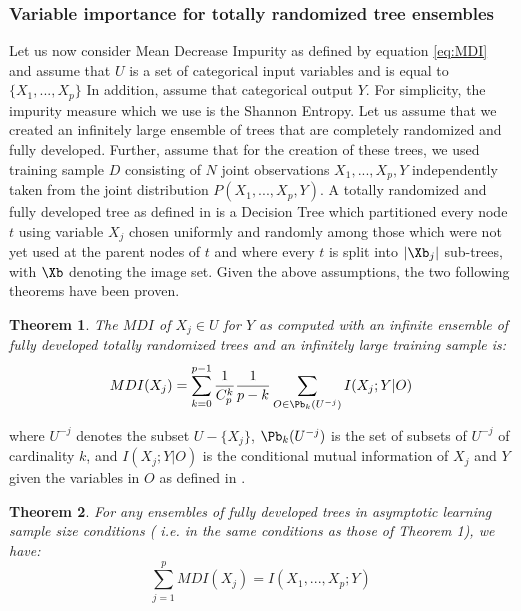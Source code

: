 \subsubsection{Variable importance for totally randomized tree ensembles}
Let us now consider Mean Decrease Impurity as defined by equation \eqref{eq:MDI} 
and assume that $U$ is a set of categorical input variables 
and is equal to $\{X_1,...,X_p\}$ 
In addition, assume that categorical output $Y$. 
For simplicity, the impurity measure which we use is the Shannon Entropy. 
Let us assume that we created an infinitely large ensemble of trees that are completely randomized and fully developed.
Further, assume  that for the creation of these trees, we used training sample $D$ consisting of $N$ joint observations 
$X_1,...,X_p,Y$ independently taken from the joint distribution $P(X_1,...,X_p,Y)$. 
A totally randomized and fully developed tree as defined in \cite{louppe2013understanding} is a Decision Tree 
which partitioned every node $t$ using variable $X_j$ chosen uniformly and randomly among those 
which were not yet used at the parent nodes of $t$
and where every $t$ is split into $|\Xb_j|$ sub-trees, with $\Xb$ denoting the image set. 
Given the above assumptions, the two following theorems have been proven.

\newtheorem{theorem}{Theorem}
\begin{theorem}
    The $MDI$ of $X_j \in U$ for $Y$ as computed with an infinite ensemble of fully developed totally randomized trees and an infinitely large training sample is:
    \begin{equation}
	{MDI}( X_{j} ) = \displaystyle \sum_{k=0}^{p-1}\frac{1}{C^k_p}\frac{1}{p-k} \displaystyle\sum_{O \in \Pb_{k}(U^{-j})} I(X_j;Y|O)
    \end{equation}
    
\end{theorem}

where $U^{-j}$ denotes the subset $U-\{X_j\}$, $\Pb_{k}(U^{-j})$ is the set of subsets of $U^{-j}$
of cardinality $k$, and $I(X_j;Y|O)$ is the conditional mutual information of $X_j$ 
and $Y$ given the variables in $O$ as defined in \cite{kohavi1997importance}.

\begin{theorem}
	For any ensembles of fully developed trees in asymptotic learning sample size conditions (
	i.e. in the same conditions as those of Theorem 1), we have:
	\begin{equation}
	\displaystyle \sum_{j=1}^{p}{MDI}( X_{j} ) = I(X_1,...,X_p;Y)
     \end{equation}
	
\end{theorem}

